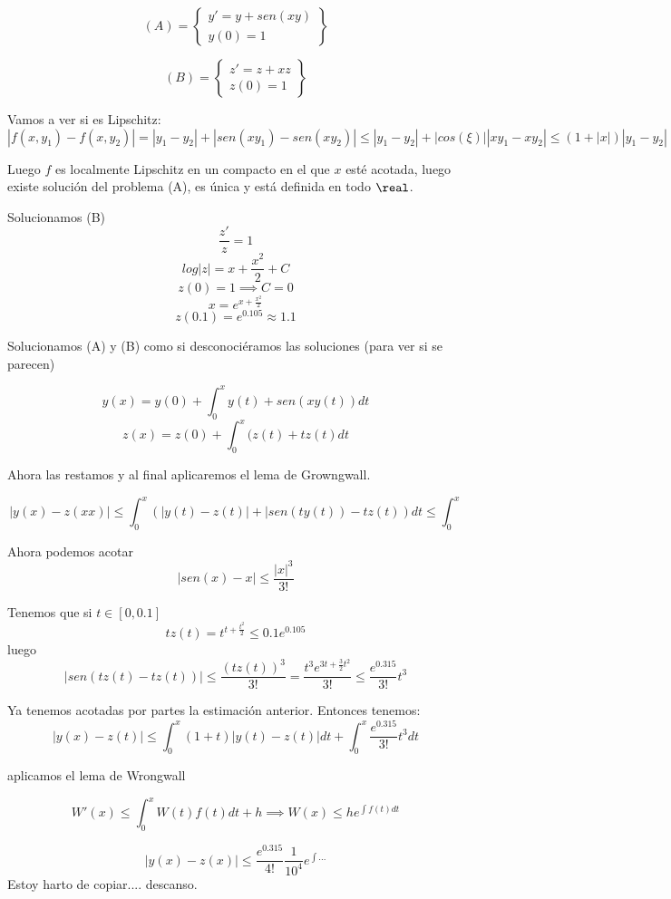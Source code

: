 \documentclass[nochap]{apuntes}
\begin{document}
\begin{problem}[15]
\[(A)=\left\{\begin{array}{c} y'=y+sen(xy)\\y(0)=1 \end{array}\right\}\]

\[(B)=\left\{\begin{array}{c} z'=z+xz\\z(0)=1 \end{array}\right\}\]

\solution

Vamos a ver si es Lipschitz:
$|f(x,y_1) - f(x,y_2)| = |y_1-y_2| + |sen(xy_1) -sen(xy_2)| \leq |y_1-y_2| + |cos(\xi)| |xy_1 - xy_2| \leq (1+|x|)|y_1-y_2|$

Luego $f$ es localmente Lipschitz en un compacto en el que $x$ esté acotada, luego existe solución del problema (A), es única y está definida en todo $\real$.


Solucionamos (B) \[\frac{z'}{z} = 1\]
\[log|z| = x+\frac{x^2}{2} + C\]
\[z(0)=1 \implies C=0\]
\[x = e^{x+\frac{x^2}{2}}\]
\[z(0.1) = e^{0.105} \approx 1.1\]

Solucionamos (A) y (B) como si desconociéramos las soluciones (para ver si se parecen)

\[y(x) = y(0) + \int_0^x y(t) + sen(xy(t))dt\]
\[z(x) = z(0) + \int_0^x (z(t) + tz(t)dt\]	

Ahora las restamos y al final aplicaremos el lema de Growngwall.

\[|y(x) - z(xx)| \leq \int_0^x \left(|y(t)-z(t)| + |sen(ty(t)) - tz(t)\right) dt \leq \int_0^x\]

Ahora podemos acotar \[|sen(x) - x| \leq \frac{|x|^3}{3!}\]

Tenemos que si $t\in[0,0.1]$
\[tz(t) = t^{t+\frac{t^2}{2}} \leq 0.1e^{0.105}\]
luego 
\[|sen(tz(t) - tz(t))| \leq \frac{(tz(t))^3}{3!} = \frac{t^3e^{3t+\frac{3}{2}t^2}}{3!} \leq \frac{e^{0.315}}{3!}t^3\]

Ya tenemos acotadas por partes la estimación anterior. Entonces tenemos:
\[|y(x) - z(t)| \leq \int_0^x (1+t)|y(t)-z(t)|dt + \int_0^x\frac{e^{0.315}}{3!}t^3dt\]

aplicamos el lema de Wrongwall

\[W'(x) \leq \int_0^x W(t) f(t) dt + h \implies W(x) \leq h e^{\int f(t)dt}\]

\[|y(x) - z(x)| \leq \frac{e^{0.315}}{4!} \frac{1}{10^4} e^{\int...}\]
Estoy harto de copiar.... descanso.

\end{problem}
\newpage
\printindex
\end{document}
